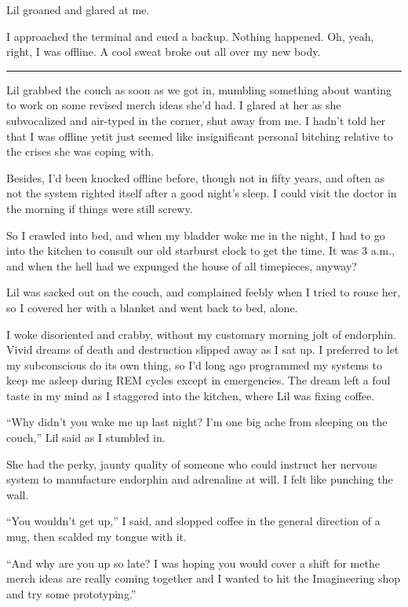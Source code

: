 Lil groaned and glared at me.

I approached the terminal and cued a backup. Nothing happened. Oh,
yeah, right, I was offline. A cool sweat broke out all over my new
body.

\begin{center}\rule{3in}{0.4pt}\end{center}

Lil grabbed the couch as soon as we got in, mumbling something
about wanting to work on some revised merch ideas she'd had. I
glared at her as she subvocalized and air-typed in the corner, shut
away from me. I hadn't told her that I was offline yet{\dash}it just
seemed like insignificant personal bitching relative to the crises
she was coping with.

Besides, I'd been knocked offline before, though not in fifty
years, and often as not the system righted itself after a good
night's sleep. I could visit the doctor in the morning if things
were still screwy.

So I crawled into bed, and when my bladder woke me in the night, I
had to go into the kitchen to consult our old starburst clock to
get the time. It was 3 a.m., and when the hell had we expunged the
house of all timepieces, anyway?

Lil was sacked out on the couch, and complained feebly when I tried
to rouse her, so I covered her with a blanket and went back to bed,
alone.

I woke disoriented and crabby, without my customary morning jolt of
endorphin. Vivid dreams of death and destruction slipped away as I
sat up. I preferred to let my subconscious do its own thing, so I'd
long ago programmed my systems to keep me asleep during REM cycles
except in emergencies. The dream left a foul taste in my mind as I
staggered into the kitchen, where Lil was fixing coffee.

“Why didn't you wake me up last night? I'm one big ache from
sleeping on the couch,” Lil said as I stumbled in.

She had the perky, jaunty quality of someone who could instruct her
nervous system to manufacture endorphin and adrenaline at will. I
felt like punching the wall.

“You wouldn't get up,” I said, and slopped coffee in the general
direction of a mug, then scalded my tongue with it.

“And why are you up so late? I was hoping you would cover a shift
for me{\dash}the merch ideas are really coming together and I wanted to
hit the Imagineering shop and try some prototyping.”

